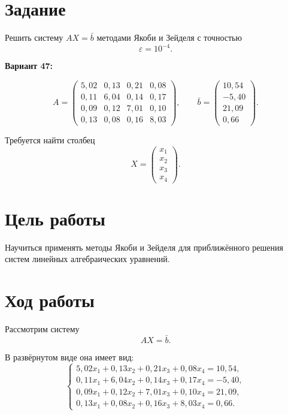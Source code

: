 \section{Задание}

Решить систему $AX=\bar b$ методами Якоби и Зейделя с точностью
\[
\varepsilon = 10^{-4}.
\]

\medskip
\noindent\textbf{Вариант 47:}

\[
A=
\begin{pmatrix}
5{,}02 & 0{,}13 & 0{,}21 & 0{,}08\\
0{,}11 & 6{,}04 & 0{,}14 & 0{,}17\\
0{,}09 & 0{,}12 & 7{,}01 & 0{,}10\\
0{,}13 & 0{,}08 & 0{,}16 & 8{,}03
\end{pmatrix},
\qquad
\bar b=
\begin{pmatrix}
10{,}54\\
-5{,}40\\
21{,}09\\
0{,}66
\end{pmatrix}.
\]

Требуется найти столбец
\[
X=
\begin{pmatrix}
x_1\\
x_2\\
x_3\\
x_4
\end{pmatrix}.
\]

\section{Цель работы}

Научиться применять методы Якоби и Зейделя для приближённого решения систем линейных алгебраических уравнений.

\section{Ход работы}

Рассмотрим систему
\[
AX=\bar b.
\]

В развёрнутом виде она имеет вид:
\[
\begin{cases}
5{,}02x_1+0{,}13x_2+0{,}21x_3+0{,}08x_4=10{,}54,\\
0{,}11x_1+6{,}04x_2+0{,}14x_3+0{,}17x_4=-5{,}40,\\
0{,}09x_1+0{,}12x_2+7{,}01x_3+0{,}10x_4=21{,}09,\\
0{,}13x_1+0{,}08x_2+0{,}16x_3+8{,}03x_4=0{,}66.
\end{cases}
\]

